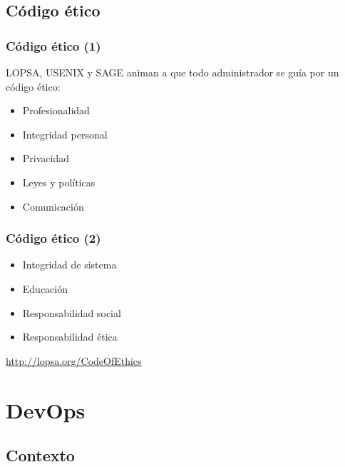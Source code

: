 \documentclass{beamer}
\begin{document}

\subsection{Código ético}
\begin{frame}
\frametitle{Código ético (1)}

LOPSA, USENIX y SAGE animan a que todo administrador se guía por un código ético:  

\begin{itemize}
\item Profesionalidad
\item Integridad personal
\item Privacidad
\item Leyes y políticas
\item Comunicación
\end{itemize}
\end{frame}


\begin{frame}
\frametitle{Código ético (2)}

\begin{itemize}
\item Integridad de sistema
\item Educación
\item Responsabilidad social
\item Responsabilidad ética
\end{itemize}

\url{http://lopsa.org/CodeOfEthics}

\end{frame}


\section{DevOps}
\subsection{Contexto}
\end{document}
